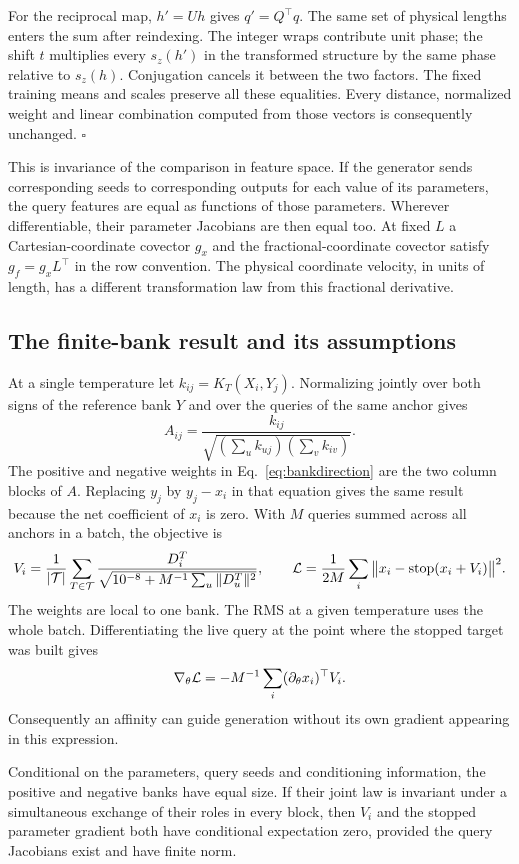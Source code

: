 For the reciprocal map, \(h'=Uh\) gives \(q'=Q^\top q\). The same set of physical lengths enters the sum after reindexing. The integer wraps contribute unit phase; the shift \(t\) multiplies every \(s_z(h')\) in the transformed structure by the same phase relative to \(s_z(h)\). Conjugation cancels it between the two factors. The fixed training means and scales preserve all these equalities. Every distance, normalized weight and linear combination computed from those vectors is consequently unchanged. \(\square\)

This is invariance of the comparison in feature space. If the generator sends corresponding seeds to corresponding outputs for each value of its parameters, the query features are equal as functions of those parameters. Wherever differentiable, their parameter Jacobians are then equal too. At fixed \(L\) a Cartesian-coordinate covector \(g_x\) and the fractional-coordinate covector satisfy \(g_f=g_x L^\top\) in the row convention. The physical coordinate velocity, in units of length, has a different transformation law from this fractional derivative.

\subsection{The finite-bank result and its assumptions}
At a single temperature let \(k_{ij}=K_T(X_i,Y_j)\). Normalizing jointly over both signs of the reference bank \(Y\) and over the queries of the same anchor gives
\[
 A_{ij}=\frac{k_{ij}}{\sqrt{(\sum_u k_{uj})(\sum_v k_{iv})}} .
\]
The positive and negative weights in Eq.~\eqref{eq:bankdirection} are the two column blocks of \(A\). Replacing \(y_j\) by \(y_j-x_i\) in that equation gives the same result because the net coefficient of \(x_i\) is zero. With \(M\) queries summed across all anchors in a batch, the objective is
\[
 V_i=\frac1{|\mathcal T|}\sum_{T\in\mathcal T}
 \frac{D_i^T}{\sqrt{10^{-8}+M^{-1}\sum_u\|D_u^T\|^2}},\qquad
 {\cal L}=\frac1{2M}\sum_i\big\|x_i-\operatorname{stop}(x_i+V_i)\big\|^2 .
\]
The weights are local to one bank. The RMS at a given temperature uses the whole batch. Differentiating the live query at the point where the stopped target was built gives
\[
 \nabla_\theta{\cal L}=-M^{-1}\sum_i(\partial_\theta x_i)^\top V_i .
\]
Consequently an affinity can guide generation without its own gradient appearing in this expression.

\begin{suppprop}\label{prop:bank}
Conditional on the parameters, query seeds and conditioning information, the positive and negative banks have equal size. If their joint law is invariant under a simultaneous exchange of their roles in every block, then \(V_i\) and the stopped parameter gradient both have conditional expectation zero, provided the query Jacobians exist and have finite norm.
\end{suppprop}


